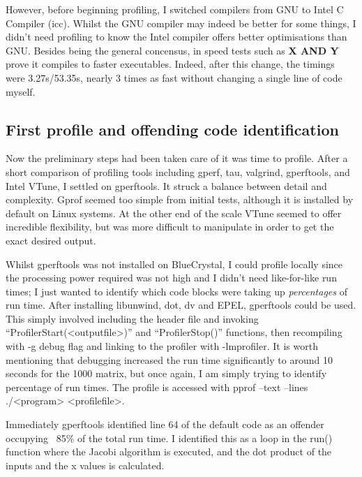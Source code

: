 \documentclass{article}
\begin{document}
However, before beginning profiling, I switched compilers from GNU to Intel C Compiler (icc). Whilst the GNU compiler may indeed be better for some things, I didn't need profiling to know the Intel compiler offers better optimisations than GNU. Besides being the general concensus, in speed tests such as \textbf{X AND Y} prove it compiles to faster executables. Indeed, after this change, the timings were 3.27s/53.35s, nearly 3 times as fast without changing a single line of code myself.

\subsection{First profile and offending code identification}
Now the preliminary steps had been taken care of it was time to profile. After a short comparison of profiling tools including gperf, tau, valgrind, gperftools, and Intel VTune, I settled on gperftools. It struck a balance between detail and complexity. Gprof seemed too simple from initial tests, although it is installed by default on Linux systems. At the other end of the scale VTune seemed to offer incredible flexibility, but was more difficult to manipulate in order to get the exact desired output.

Whilst gperftools was not installed on BlueCrystal, I could profile locally since the processing power required was not high and I didn't need like-for-like run times; I just wanted to identify which code blocks were taking up \emph{percentages} of run time. After installing libunwind, dot, dv and EPEL, gperftools could be used. This simply involved including the header file and invoking ``ProfilerStart(<outputfile>)'' and ``ProfilerStop()'' functions, then recompiling with -g debug flag and linking to the profiler with -lmprofiler. It is worth mentioning that debugging increased the run time significantly to around 10 seconds for the 1000 matrix, but once again, I am simply trying to identify percentage of run times. The profile is accessed with pprof --text --lines ./<program> <profilefile>.

Immediately gperftools identified line 64 of the default code as an offender occupying ~85\% of the total run time. I identified this as a loop in the run() function where the Jacobi algorithm is executed, and the dot product of the inputs and the x values is calculated.
\end{document}
